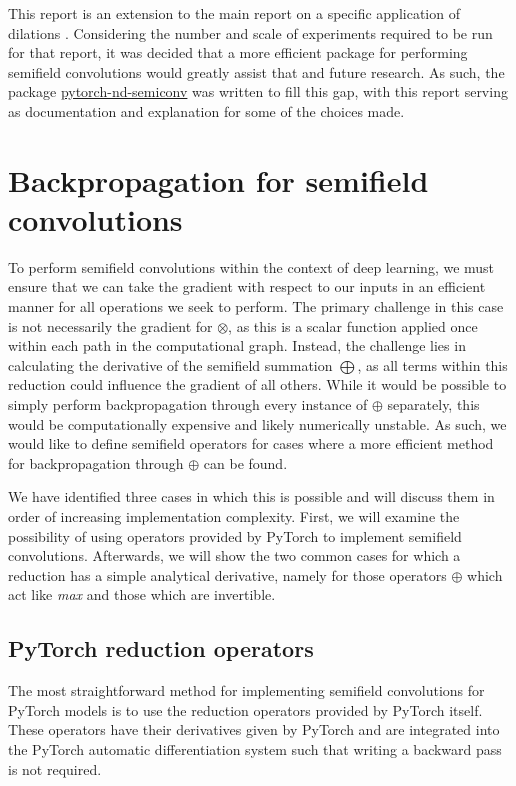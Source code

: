 \documentclass[a4paper, 12pt, openright]{report}
\begin{document}
This report is an extension to the main report on a specific application of dilations \cite{main_thesis}. Considering the number and scale of experiments required to be run for that report, it was decided that a more efficient package for performing semifield convolutions would greatly assist that and future research. As such, the package \href{https://pypi.org/project/pytorch-nd-semiconv}{\color{cyan}pytorch-nd-semiconv} was written to fill this gap, with this report serving as documentation and explanation for some of the choices made.

\newpage


\chapter{Backpropagation for semifield convolutions}
To perform semifield convolutions within the context of deep learning, we must ensure that we can take the gradient with respect to our inputs in an efficient manner for all operations we seek to perform. 
The primary challenge in this case is not necessarily the gradient for $\otimes$, as this is a scalar function applied once within each path in the computational graph. Instead, the challenge lies in calculating the derivative of the semifield summation $\bigoplus$, as all terms within this reduction could influence the gradient of all others. While it would be possible to simply perform backpropagation through every instance of $\oplus$ separately, this would be computationally expensive and likely numerically unstable. As such, we would like to define semifield operators for cases where a more efficient method for backpropagation through $\oplus$ can be found.

We have identified three cases in which this is possible and will discuss them in order of increasing implementation complexity. First, we will examine the possibility of using operators provided by PyTorch to implement semifield convolutions. Afterwards, we will show the two common cases for which a reduction has a simple analytical derivative, namely for those operators $\oplus$ which act like \textit{max} and those which are invertible.

\section{PyTorch reduction operators}
The most straightforward method for implementing semifield convolutions for PyTorch models is to use the reduction operators provided by PyTorch itself. These operators have their derivatives given by PyTorch and are integrated into the PyTorch automatic differentiation system such that writing a backward pass is not required.
\end{document}
